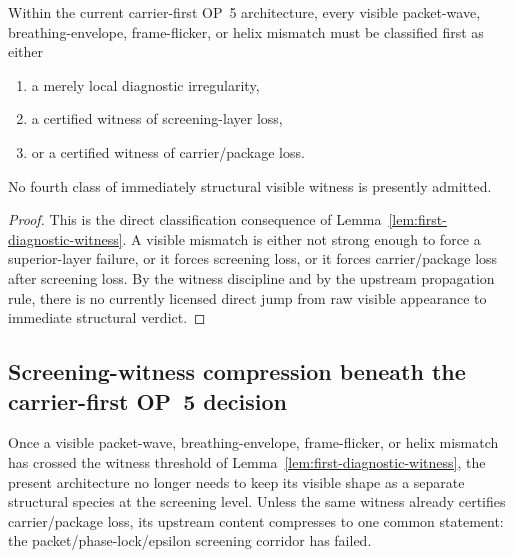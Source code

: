 \begin{corollary}
\label{cor:visible-witness-admissibility}
Within the current carrier-first OP~5 architecture, every visible packet-wave, breathing-envelope, frame-flicker, or helix mismatch must be classified first as either
\begin{enumerate}[leftmargin=2em,label=(\alph*)]
\item a merely local diagnostic irregularity,
\item a certified witness of screening-layer loss,
\item or a certified witness of carrier/package loss.
\end{enumerate}
No fourth class of immediately structural visible witness is presently admitted.
\end{corollary}

\begin{proof}
This is the direct classification consequence of Lemma~\ref{lem:first-diagnostic-witness}. A visible mismatch is either not strong enough to force a superior-layer failure, or it forces screening loss, or it forces carrier/package loss after screening loss. By the witness discipline and by the upstream propagation rule, there is no currently licensed direct jump from raw visible appearance to immediate structural verdict.
\end{proof}


\subsection{Screening-witness compression beneath the carrier-first OP~5 decision}
\label{sec:screening-witness-compression}

\begin{remark}
Once a visible packet-wave, breathing-envelope, frame-flicker, or helix mismatch has crossed the witness threshold of Lemma~\ref{lem:first-diagnostic-witness}, the present architecture no longer needs to keep its visible shape as a separate structural species at the screening level. Unless the same witness already certifies carrier/package loss, its upstream content compresses to one common statement: the packet/phase-lock/epsilon screening corridor has failed.
\end{remark}

